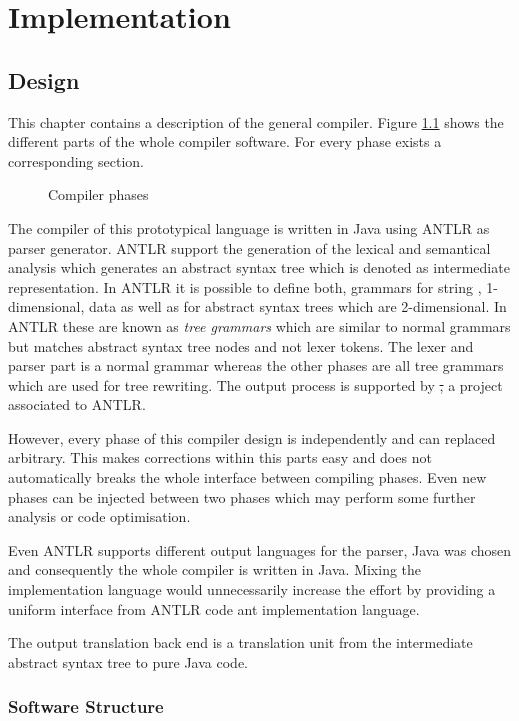 \chapter{Implementation}
\section{Design}
This chapter contains a description of the general compiler. Figure
\ref{fig:compilerPhase} shows the different parts of the whole compiler
software. For every phase exists a corresponding section.

\begin{figure}[ht]
	\centerline{}
	\caption{Compiler phases}
	\label{fig:compilerPhase}
\end{figure}

The compiler of this prototypical language is written in Java using
ANTLR as parser generator. ANTLR support the generation of the lexical
and semantical analysis which generates an abstract syntax tree which
is denoted as intermediate representation. In ANTLR it is possible to
define both, grammars for string , 1-dimensional, data as well as for
abstract syntax trees which are 2-dimensional. In ANTLR these are known
as \emph{tree grammars} which are similar to normal grammars but matches
abstract syntax tree nodes and not lexer tokens. The lexer and parser
part is a normal grammar whereas the other phases are all tree grammars
which are used for tree rewriting. The output process is supported by
\st, a project associated to ANTLR.

However, every phase of this compiler design is independently and can 
replaced arbitrary. This makes corrections within this parts easy and
does not automatically breaks the whole interface between compiling
phases. Even new phases can be injected between two phases which may 
perform some further analysis or code optimisation.

Even ANTLR supports different output languages for the parser, Java was
chosen and consequently the whole compiler is written in Java. Mixing
the implementation language would unnecessarily increase the effort
by providing a uniform interface from ANTLR code ant implementation
language.

The output translation back end is a translation unit from the
intermediate abstract syntax tree to pure Java code.

\subsection{Software Structure}

